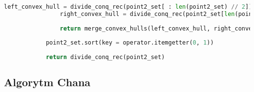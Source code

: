 \documentclass[11pt]{article}
\theoremstyle{remark} \newtheorem{definition}{def.}
\theoremstyle{definition} \newtheorem{twierdzenie}{tw.}
\begin{document}
\begin{lstlisting}[language=Python]
                left_convex_hull = divide_conq_rec(point2_set[ : len(point2_set) // 2])
                right_convex_hull = divide_conq_rec(point2_set[len(point2_set) // 2 : ])
            
                return merge_convex_hulls(left_convex_hull, right_convex_hull)
            
            point2_set.sort(key = operator.itemgetter(0, 1))    
        
            return divide_conq_rec(point2_set)

    \end{lstlisting}



\subsection{Algorytm Chana}
\end{document}
